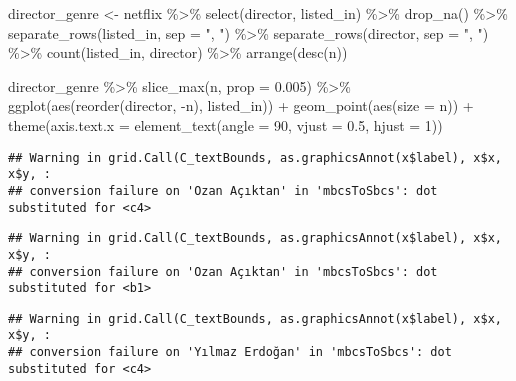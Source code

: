\documentclass[
]{article}
\newenvironment{Shaded}{\begin{snugshade}}{\end{snugshade}}
\newcommand{\AttributeTok}[1]{\textcolor[rgb]{0.77,0.63,0.00}{#1}}
\newcommand{\DecValTok}[1]{\textcolor[rgb]{0.00,0.00,0.81}{#1}}
\newcommand{\FloatTok}[1]{\textcolor[rgb]{0.00,0.00,0.81}{#1}}
\newcommand{\FunctionTok}[1]{\textcolor[rgb]{0.00,0.00,0.00}{#1}}
\newcommand{\NormalTok}[1]{#1}
\newcommand{\OtherTok}[1]{\textcolor[rgb]{0.56,0.35,0.01}{#1}}
\newcommand{\SpecialCharTok}[1]{\textcolor[rgb]{0.00,0.00,0.00}{#1}}
\newcommand{\StringTok}[1]{\textcolor[rgb]{0.31,0.60,0.02}{#1}}
\begin{document}
\begin{Shaded}
\begin{Highlighting}[]
\NormalTok{director\_genre }\OtherTok{\textless{}{-}}\NormalTok{ netflix }\SpecialCharTok{\%\textgreater{}\%} 
  \FunctionTok{select}\NormalTok{(director, listed\_in) }\SpecialCharTok{\%\textgreater{}\%} 
  \FunctionTok{drop\_na}\NormalTok{() }\SpecialCharTok{\%\textgreater{}\%} 
  \FunctionTok{separate\_rows}\NormalTok{(listed\_in, }\AttributeTok{sep =} \StringTok{", "}\NormalTok{) }\SpecialCharTok{\%\textgreater{}\%} 
  \FunctionTok{separate\_rows}\NormalTok{(director, }\AttributeTok{sep =} \StringTok{", "}\NormalTok{) }\SpecialCharTok{\%\textgreater{}\%} 
  \FunctionTok{count}\NormalTok{(listed\_in, director) }\SpecialCharTok{\%\textgreater{}\%} 
  \FunctionTok{arrange}\NormalTok{(}\FunctionTok{desc}\NormalTok{(n))}

\NormalTok{director\_genre }\SpecialCharTok{\%\textgreater{}\%} 
  \FunctionTok{slice\_max}\NormalTok{(n, }\AttributeTok{prop =} \FloatTok{0.005}\NormalTok{) }\SpecialCharTok{\%\textgreater{}\%} 
  \FunctionTok{ggplot}\NormalTok{(}\FunctionTok{aes}\NormalTok{(}\FunctionTok{reorder}\NormalTok{(director, }\SpecialCharTok{{-}}\NormalTok{n), listed\_in)) }\SpecialCharTok{+}
  \FunctionTok{geom\_point}\NormalTok{(}\FunctionTok{aes}\NormalTok{(}\AttributeTok{size =}\NormalTok{ n)) }\SpecialCharTok{+}
  \FunctionTok{theme}\NormalTok{(}\AttributeTok{axis.text.x =} \FunctionTok{element\_text}\NormalTok{(}\AttributeTok{angle =} \DecValTok{90}\NormalTok{, }\AttributeTok{vjust =} \FloatTok{0.5}\NormalTok{, }\AttributeTok{hjust =} \DecValTok{1}\NormalTok{))}
\end{Highlighting}
\end{Shaded}

\begin{verbatim}
## Warning in grid.Call(C_textBounds, as.graphicsAnnot(x$label), x$x, x$y, :
## conversion failure on 'Ozan Açıktan' in 'mbcsToSbcs': dot substituted for <c4>
\end{verbatim}

\begin{verbatim}
## Warning in grid.Call(C_textBounds, as.graphicsAnnot(x$label), x$x, x$y, :
## conversion failure on 'Ozan Açıktan' in 'mbcsToSbcs': dot substituted for <b1>
\end{verbatim}

\begin{verbatim}
## Warning in grid.Call(C_textBounds, as.graphicsAnnot(x$label), x$x, x$y, :
## conversion failure on 'Yılmaz Erdoğan' in 'mbcsToSbcs': dot substituted for <c4>
\end{verbatim}
\end{document}
